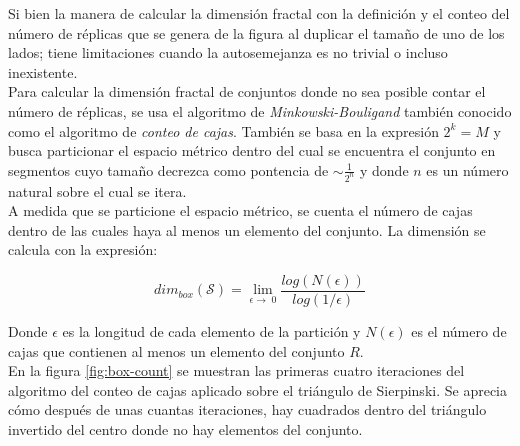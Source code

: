 \documentclass[letterpaper,12pt,oneside]{book}
\begin{document}
Si bien la manera de calcular la dimensión fractal con la definición y el conteo del número de réplicas que se genera de la figura al duplicar el tamaño de uno de los lados; tiene limitaciones cuando la autosemejanza es no trivial o incluso inexistente.
\\

Para calcular la dimensión fractal de conjuntos donde no sea posible contar el número de réplicas, se usa el algoritmo  de \textit{Minkowski-Bouligand} también conocido como el algoritmo de \textit{conteo de cajas}. También se basa en la expresión $2^{k} = M$ y busca particionar el espacio métrico dentro del cual se encuentra el conjunto en segmentos cuyo tamaño decrezca como pontencia de $\sim \frac{1}{2^{n}}$ y donde $n$ es un número natural sobre el cual se itera. 
\\


A medida que se particione el espacio métrico, se cuenta el número de cajas dentro de las cuales haya al menos un elemento del conjunto. La dimensión se calcula con la expresión:

\begin{equation}
    dim_{box}(\mathcal{S}) = \lim_{\epsilon \to \; 0} \frac{log (N(\epsilon))}{log(1/\epsilon)}
    \label{eq:dimfractal}
\end{equation}

Donde $\epsilon$ es la longitud de cada elemento de la partición y $N(\epsilon)$ es el número de cajas que contienen al menos un elemento del conjunto $R$.
\\

En la figura \ref{fig:box-count} se muestran las primeras cuatro iteraciones del algoritmo del conteo de cajas aplicado sobre el triángulo de Sierpinski. Se aprecia cómo después de unas cuantas iteraciones, hay cuadrados dentro del triángulo invertido del centro donde no hay elementos del conjunto.
\\
\end{document}
